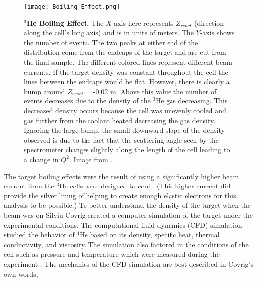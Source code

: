 \begin{figure}[!ht]
\begin{center}
\texttt{[image: Boiling\_Effect.png]}
\end{center}
\caption[$^3$He Boiling Effect]{
{\bf{$^3$He Boiling Effect.}} The $X$-axis here represents $Z_{react}$ (direction along the cell's long axis) and is in units of meters. The $Y$-axis shows the number of events. The two peaks at either end of the distribution come from the endcaps of the target and are cut from the final sample. The different colored lines represent different beam currents. If the target density was constant throughout the cell the lines between the endcaps would be flat. However, there is clearly a bump around $Z_{react}$ = -0.02 m. Above this value the number of events decreases due to the density of the $^3$He gas decreasing. This decreased density occurs because the cell was unevenly cooled and gas further from the coolant heated decreasing the gas density. Ignoring the large bump, the small downward slope of the density observed is due to the fact that the scattering angle seen by the spectrometer changes slightly along the length of the cell leading to a change in $Q^2$.  Image from \cite{Thesis:Ye}.}
\label{fig:boiling_effect}
\end{figure}

The target boiling effects were the result of using a significantly higher beam current than the $^3$He cells were designed to cool \cite{dave}. (This higher current did provide the silver lining of helping to create enough elastic electrons for this analysis to be possible.) To better understand the density of the target when the beam was on Silviu Covrig created a computer simulation of the target under the experimental conditions. The computational fluid dynamics (CFD) simulation studied the behavior of $^4$He based on its density, specific heat, thermal conductivity, and viscosity. The simulation also factored in the conditions of the cell such as pressure and temperature which were measured during the experiment \cite{density}. The mechanics of the CFD simulation are best described in Covrig's own words, 

